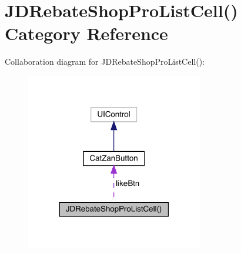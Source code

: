 \hypertarget{category_j_d_rebate_shop_pro_list_cell_07_08}{}\section{J\+D\+Rebate\+Shop\+Pro\+List\+Cell() Category Reference}
\label{category_j_d_rebate_shop_pro_list_cell_07_08}


Collaboration diagram for J\+D\+Rebate\+Shop\+Pro\+List\+Cell()\+:\nopagebreak
\begin{figure}[H]
\begin{center}
\leavevmode
\includegraphics[width=219pt]{category_j_d_rebate_shop_pro_list_cell_07_08__coll__graph}
\end{center}
\end{figure}
